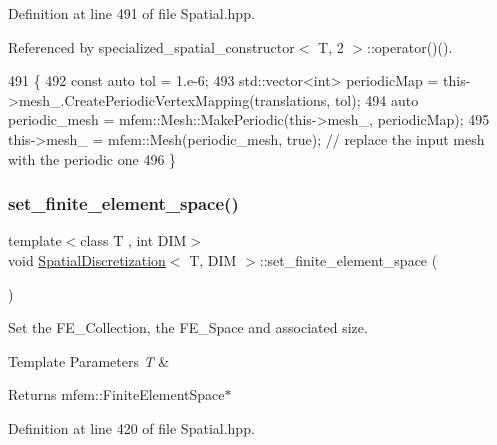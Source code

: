 Definition at line 491 of file Spatial.\+hpp.



Referenced by specialized\+\_\+spatial\+\_\+constructor$<$ T, 2 $>$\+::operator()().


\begin{DoxyCode}
491                                                                                          \{
492   \textcolor{keyword}{const} \textcolor{keyword}{auto} tol = 1.e-6;
493   std::vector<int> periodicMap = this->mesh\_.CreatePeriodicVertexMapping(translations, tol);
494   \textcolor{keyword}{auto} periodic\_mesh = mfem::Mesh::MakePeriodic(this->mesh\_, periodicMap);
495   this->mesh\_ = mfem::Mesh(periodic\_mesh, \textcolor{keyword}{true});  \textcolor{comment}{// replace the input mesh with the periodic one}
496 \}
\end{DoxyCode}
\mbox{\label{classSpatialDiscretization_a8400a265a094312b4d57708d44f9d627}} 
\subsubsection{\texorpdfstring{set\+\_\+finite\+\_\+element\+\_\+space()}{set\_finite\_element\_space()}}
{\footnotesize\ttfamily template$<$class T , int D\+IM$>$ \\
void \hyperlink{classSpatialDiscretization}{Spatial\+Discretization}$<$ T, D\+IM $>$\+::set\+\_\+finite\+\_\+element\+\_\+space (\begin{DoxyParamCaption}{ }\end{DoxyParamCaption})}



Set the F\+E\+\_\+\+Collection, the F\+E\+\_\+\+Space and associated size. 


\begin{DoxyTemplParams}{Template Parameters}
{\em T} & \\
\hline
\end{DoxyTemplParams}
\begin{DoxyReturn}{Returns}
mfem\+::\+Finite\+Element\+Space$\ast$ 
\end{DoxyReturn}


Definition at line 420 of file Spatial.\+hpp.



